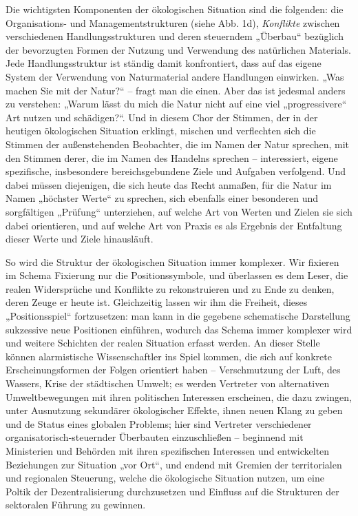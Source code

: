 \documentclass[11pt,a4paper]{article}
\begin{document}
Die wichtigsten Komponenten der ökologischen Situation sind die folgenden: die
Organisa\-tions- und Managementstrukturen (siehe Abb. 1d), \emph{Konflikte}
zwischen verschiedenen Handlungsstrukturen und deren steuerndem „Überbau“
bezüglich der bevorzugten Formen der Nutzung und Verwendung des natürlichen
Materials.  Jede Handlungsstruktur ist ständig damit konfrontiert, dass auf
das eigene System der Verwendung von Naturmaterial andere Handlungen
einwirken.  „Was machen Sie mit der Natur?“ -- fragt man die einen. Aber das
ist jedesmal anders zu verstehen: „Warum lässt du mich die Natur nicht auf
eine viel „progressivere“ Art nutzen und schädigen?“. Und in diesem Chor der
Stimmen, der in der heutigen ökologischen Situation erklingt, mischen und
verflechten sich die Stimmen der außenstehenden Beobachter, die im Namen der
Natur sprechen, mit den Stimmen derer, die im Namen des Handelns sprechen --
interessiert, eigene spezifische, insbesondere bereichsgebundene Ziele und
Aufgaben verfolgend. Und dabei müssen diejenigen, die sich heute das Recht
anmaßen, für die Natur im Namen „höchster Werte“ zu sprechen, sich ebenfalls
einer besonderen und sorgfältigen „Prüfung“ unterziehen, auf welche Art von
Werten und Zielen sie sich dabei orientieren, und auf welche Art von Praxis
es als Ergebnis der Entfaltung dieser Werte und Ziele hinausläuft.

So wird die Struktur der ökologischen Situation immer komplexer. Wir fixieren
im Schema Fixierung nur die Positionssymbole, und überlassen es dem Leser, die
realen Widersprüche und Konflikte zu rekonstruieren und zu Ende zu denken,
deren Zeuge er heute ist. Gleichzeitig lassen wir ihm die Freiheit, dieses
„Positionsspiel“ fortzusetzen: man kann in die gegebene schematische
Darstellung sukzessive neue Positionen einführen, wodurch das Schema immer
komplexer wird und weitere Schichten der realen Situation erfasst werden. An
dieser Stelle können alarmistische Wissenschaftler ins Spiel kommen, die sich
auf konkrete Erscheinungsformen der Folgen orientiert haben -- Verschmutzung
der Luft, des Wassers, Krise der städtischen Umwelt; es werden Vertreter von
alternativen Umweltbewegungen mit ihren politischen Interessen erscheinen, die
dazu zwingen, unter Ausnutzung sekundärer ökologischer Effekte, ihnen neuen
Klang zu geben und de Status eines globalen Problems; hier sind Vertreter
verschiedener organisatorisch-steuernder Überbauten einzuschließen --
beginnend mit Ministerien und Behörden mit ihren spezifischen Interessen und
entwickelten Beziehungen zur Situation „vor Ort“, und endend mit Gremien der
territorialen und regionalen Steuerung, welche die ökologische Situation
nutzen, um eine Poltik der Dezentralisierung durchzusetzen und Einfluss auf
die Strukturen der sektoralen Führung zu gewinnen.
\end{document}
